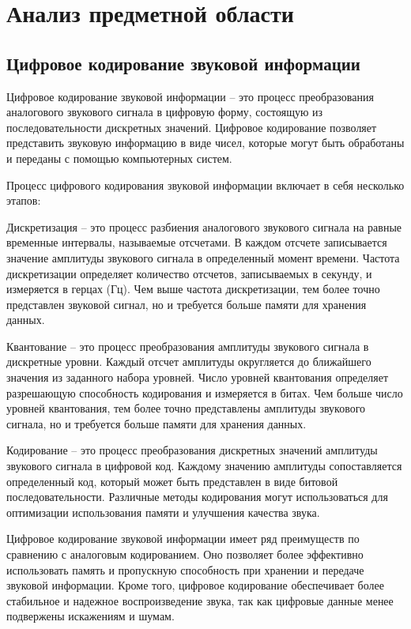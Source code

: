 \section{Анализ предметной области}
\subsection{Цифровое кодирование звуковой информации}

Цифровое кодирование звуковой информации – это процесс преобразования аналогового звукового сигнала в цифровую форму, состоящую из последовательности дискретных значений. Цифровое кодирование позволяет представить звуковую информацию в виде чисел, которые могут быть обработаны и переданы с помощью компьютерных систем.

Процесс цифрового кодирования звуковой информации включает в себя несколько этапов:

Дискретизация – это процесс разбиения аналогового звукового сигнала на равные временные интервалы, называемые отсчетами. В каждом отсчете записывается значение амплитуды звукового сигнала в определенный момент времени. Частота дискретизации определяет количество отсчетов, записываемых в секунду, и измеряется в герцах (Гц). Чем выше частота дискретизации, тем более точно представлен звуковой сигнал, но и требуется больше памяти для хранения данных.

Квантование – это процесс преобразования амплитуды звукового сигнала в дискретные уровни. Каждый отсчет амплитуды округляется до ближайшего значения из заданного набора уровней. Число уровней квантования определяет разрешающую способность кодирования и измеряется в битах. Чем больше число уровней квантования, тем более точно представлены амплитуды звукового сигнала, но и требуется больше памяти для хранения данных.

Кодирование – это процесс преобразования дискретных значений амплитуды звукового сигнала в цифровой код. Каждому значению амплитуды сопоставляется определенный код, который может быть представлен в виде битовой последовательности. Различные методы кодирования могут использоваться для оптимизации использования памяти и улучшения качества звука.

Цифровое кодирование звуковой информации имеет ряд преимуществ по сравнению с аналоговым кодированием. Оно позволяет более эффективно использовать память и пропускную способность при хранении и передаче звуковой информации. Кроме того, цифровое кодирование обеспечивает более стабильное и надежное воспроизведение звука, так как цифровые данные менее подвержены искажениям и шумам.

